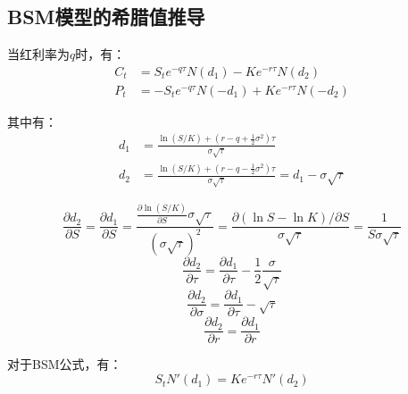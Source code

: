 \documentclass[11pt]{article}
\begin{document}
\subsection{BSM模型的希腊值推导}

当红利率为$q$时，有：
\begin{align*}
    C_t &= S_te^{-q\tau}N(d_1) - Ke^{-r\tau}N(d_2) \\
    P_t &= -S_te^{-q\tau}N(-d_1) + Ke^{-r\tau}N(-d_2)
\end{align*}

其中有：
\begin{align*}
    d_1 &= \frac{\ln(S/K) + (r-q+\frac{1}{2} \sigma^2)\tau}{\sigma \sqrt{\tau}} \\
    d_2 &= \frac{\ln(S/K) + (r-q-\frac{1}{2} \sigma^2)\tau}{\sigma \sqrt{\tau}} = d_1 - \sigma \sqrt{\tau}
\end{align*}

\begin{lemma}
    \begin{equation*}
        \frac{\partial d_2}{\partial S} = \frac{\partial d_1}{\partial S} = \frac{\frac{\partial \ln(S/K)}{\partial S} \sigma \sqrt{\tau}}{(\sigma \sqrt{\tau})^2} = \frac{\partial (\ln S - \ln K)/\partial S}{\sigma\sqrt{\tau}} = \frac{1}{S\sigma\sqrt{\tau}}
    \end{equation*}
    \begin{equation*}
        \frac{\partial d_2}{\partial \tau} = \frac{\partial d_1}{\partial \tau} - \frac{1}{2}\frac{\sigma}{\sqrt{\tau}}
    \end{equation*}
    \begin{equation*}
        \frac{\partial d_2}{\partial \sigma} = \frac{\partial d_1}{\partial \tau} - \sqrt{\tau}
    \end{equation*}
    \begin{equation*}
        \frac{\partial d_2}{\partial r} = \frac{\partial d_1}{\partial r}
    \end{equation*}
\end{lemma}

\begin{lemma}
    对于BSM公式，有：
    \begin{equation*}
        S_t N'(d_1) = Ke^{-r\tau} N'(d_2)
    \end{equation*}
\end{lemma}
\end{document}
